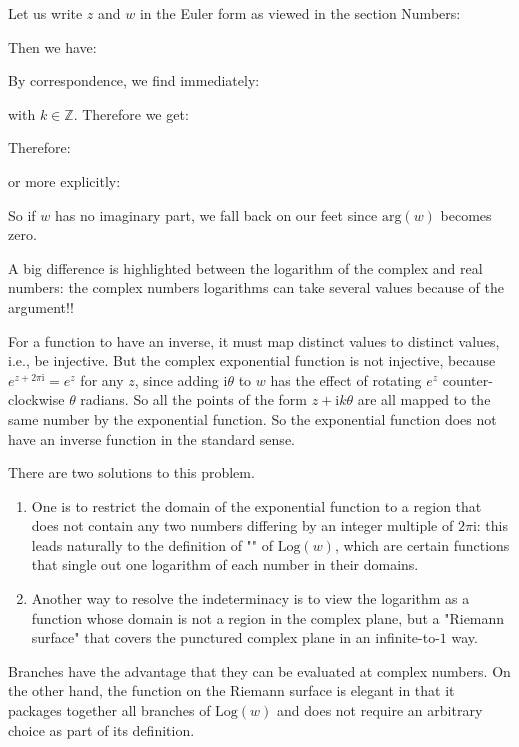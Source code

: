 	Let us write $z$ and $w$ in the Euler form as viewed in the section Numbers:
	
	Then we have:
	
	By correspondence, we find immediately:
	
	with $k \in \mathbb{Z}$. Therefore we get:
	
	Therefore:
	
	or more explicitly:
	
	So if $w$ has no imaginary part, we fall back on our feet since $\text{arg} (w)$ becomes zero.
	
	A big difference is highlighted between the logarithm of the complex and real numbers: the complex numbers logarithms can take several values because of the argument!!
	
	For a function to have an inverse, it must map distinct values to distinct values, i.e., be injective. But the complex exponential function is not injective, because $e^{z+2\pi \mathrm{i} }= e^z$ for any $z$, since adding $\mathrm{i}\theta$ to $w$ has the effect of rotating $e^z$ counter-clockwise $\theta$ radians. So all the points of the form $z+\mathrm{i}k\theta$  are all mapped to the same number by the exponential function. So the exponential function does not have an inverse function in the standard sense.
	
	There are two solutions to this problem.
	
	\begin{enumerate}
		\item One is to restrict the domain of the exponential function to a region that does not contain any two numbers differing by an integer multiple of $2\pi \mathrm{i}$: this leads naturally to the definition of "" of $\text{Log}(w)$, which are certain functions that single out one logarithm of each number in their domains.
		
		\item Another way to resolve the indeterminacy is to view the logarithm as a function whose domain is not a region in the complex plane, but a "Riemann surface" that covers the punctured complex plane in an infinite-to-$1$ way.
	\end{enumerate}
	Branches have the advantage that they can be evaluated at complex numbers. On the other hand, the function on the Riemann surface is elegant in that it packages together all branches of $\text{Log}(w)$ and does not require an arbitrary choice as part of its definition.
	
